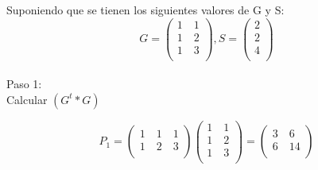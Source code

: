 \documentclass[
	11pt, %
]{beamer}
\begin{document}
\begin{frame}
  \frametitle{}
  Suponiendo que se tienen los siguientes valores de G y S:
  \[G= \begin{pmatrix}
    1 \quad 1\\
    1 \quad 2\\
    1 \quad 3\\
  \end{pmatrix},
  S = \begin{pmatrix}
    2\\
    2\\
    4\\
  \end{pmatrix}\]\\
  \bigskip %
  Paso 1:\\
  
  Calcular $(G^{t} * G)$
  
  \bigskip %

  \[P_{1}= \begin{pmatrix}
    1 \quad 1 \quad 1\\
    1 \quad 2 \quad 3\\
  \end{pmatrix}
  \begin{pmatrix}
    1 \quad 1\\
    1 \quad 2\\
    1 \quad 3\\
  \end{pmatrix} =
  \begin{pmatrix}
    3 \quad 6\\
    6 \quad 14\\
  \end{pmatrix}\]
  
  
\end{frame}
\end{document}
